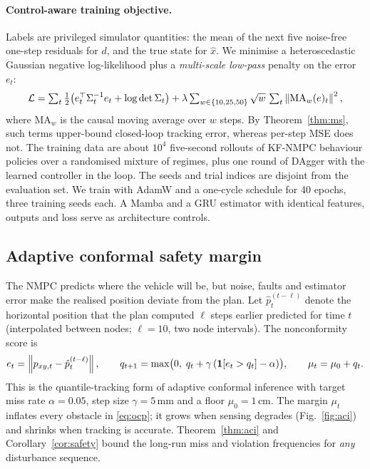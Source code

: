\paragraph{Control-aware training objective.}
Labels are privileged simulator quantities: the mean of the next five noise-free one-step residuals for $d$, and the true state for $\hat x$.
We minimise a heteroscedastic Gaussian negative log-likelihood \citep{kendall2017uncertainties} plus a \emph{multi-scale low-pass} penalty on the error $e_t$:
\begin{equation}
  \mathcal{L} = \textstyle\sum_t \tfrac12\big(e_t^{\top}\Sigma_t^{-1}e_t+\log\det\Sigma_t\big)
  + \lambda \textstyle\sum_{w\in\{10,25,50\}}\sqrt{w}\,\sum_t\left\lVert \mathrm{MA}_w(e)_t \right\rVert^2,
  \label{eq:loss}
\end{equation}
where $\mathrm{MA}_w$ is the causal moving average over $w$ steps.
By Theorem~\ref{thm:ms}, such terms upper-bound closed-loop tracking error, whereas per-step MSE does not.
The training data are about $10^4$ five-second rollouts of KF-NMPC behaviour policies over a randomised mixture of regimes, plus one round of DAgger \citep{ross2011dagger} with the learned controller in the loop. The seeds and trial indices are disjoint from the evaluation set.
We train with AdamW \citep{loshchilov2019adamw} and a one-cycle schedule for 40 epochs, three training seeds each. A Mamba \citep{gu2023mamba} and a GRU \citep{cho2014gru} estimator with identical features, outputs and loss serve as architecture controls.

\subsection{Adaptive conformal safety margin}
\label{sec:aci}
The NMPC predicts where the vehicle will be, but noise, faults and estimator error make the realised position deviate from the plan.
Let $\hat p^{(t-\ell)}_{t}$ denote the horizontal position that the plan computed $\ell$ steps earlier predicted for time $t$ (interpolated between nodes; $\ell=10$, two node intervals). The nonconformity score is
\begin{equation}
  e_t = \left\lVert p_{xy,t}-\hat p^{(t-\ell)}_{t} \right\rVert,
  \qquad
  q_{t+1} = \max\!\big(0,\; q_t+\gamma\,(\mathbf{1}[e_t>q_t]-\alpha)\big),
  \qquad
  \mu_t = \mu_0 + q_t .
  \label{eq:aci}
\end{equation}
This is the quantile-tracking form of adaptive conformal inference \citep{gibbs2021adaptive,angelopoulos2023conformal} with target miss rate $\alpha=0.05$, step size $\gamma=5$\,mm and a floor $\mu_0=1$\,cm.
The margin $\mu_t$ inflates every obstacle in \eqref{eq:ocp}; it grows when sensing degrades (Fig.~\ref{fig:aci}) and shrinks when tracking is accurate. Theorem~\ref{thm:aci} and Corollary~\ref{cor:safety} bound the long-run miss and violation frequencies for \emph{any} disturbance sequence.
